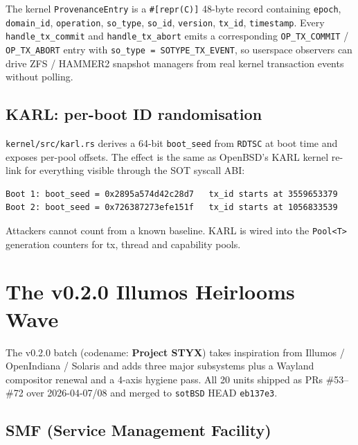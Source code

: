 \documentclass[11pt,a4paper]{article}
\begin{document}
The kernel \texttt{ProvenanceEntry} is a \texttt{\#[repr(C)]} 48-byte
record containing \texttt{epoch}, \texttt{domain\_id},
\texttt{operation}, \texttt{so\_type}, \texttt{so\_id}, \texttt{version},
\texttt{tx\_id}, \texttt{timestamp}. Every \texttt{handle\_tx\_commit}
and \texttt{handle\_tx\_abort} emits a corresponding
\texttt{OP\_TX\_COMMIT} / \texttt{OP\_TX\_ABORT} entry with
\texttt{so\_type = SOTYPE\_TX\_EVENT}, so userspace observers can drive
ZFS / HAMMER2 snapshot managers from real kernel transaction events
without polling.

\subsection{KARL: per-boot ID randomisation}

\texttt{kernel/src/karl.rs} derives a 64-bit \texttt{boot\_seed} from
\texttt{RDTSC} at boot time and exposes per-pool offsets. The effect is
the same as OpenBSD's KARL kernel re-link for everything visible
through the SOT syscall ABI:

\begin{lstlisting}[caption={Per-boot KARL drift, observed across two cold boots.},captionpos=b]
Boot 1: boot_seed = 0x2895a574d42c28d7   tx_id starts at 3559653379
Boot 2: boot_seed = 0x726387273efe151f   tx_id starts at 1056833539
\end{lstlisting}

Attackers cannot count from a known baseline. KARL is wired into the
\texttt{Pool<T>} generation counters for tx, thread and capability
pools.

\section{The v0.2.0 Illumos Heirlooms Wave}

The v0.2.0 batch (codename: \textbf{Project STYX}) takes inspiration
from Illumos / OpenIndiana / Solaris and adds three major subsystems
plus a Wayland compositor renewal and a 4-axis hygiene pass. All 20
units shipped as PRs \#53--\#72 over 2026-04-07/08 and merged to
\texttt{sotBSD} HEAD \texttt{eb137e3}.

\subsection{SMF (Service Management Facility)}
\end{document}

